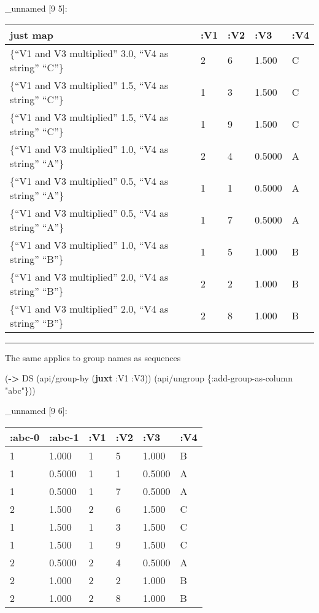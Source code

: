 \documentclass[]{article}
\newenvironment{Shaded}{\begin{snugshade}}{\end{snugshade}}
\newcommand{\KeywordTok}[1]{\textcolor[rgb]{0.13,0.29,0.53}{\textbf{#1}}}
\newcommand{\StringTok}[1]{\textcolor[rgb]{0.31,0.60,0.02}{#1}}
\newcommand{\AttributeTok}[1]{\textcolor[rgb]{0.77,0.63,0.00}{#1}}
\newcommand{\NormalTok}[1]{#1}
\begin{document}
\_unnamed {[}9 5{]}:

\begin{longtable}[]{@{}lllll@{}}
\toprule
just map & :V1 & :V2 & :V3 & :V4\tabularnewline
\midrule
\endhead
\{``V1 and V3 multiplied'' 3.0, ``V4 as string'' ``C''\} & 2 & 6 & 1.500
& C\tabularnewline
\{``V1 and V3 multiplied'' 1.5, ``V4 as string'' ``C''\} & 1 & 3 & 1.500
& C\tabularnewline
\{``V1 and V3 multiplied'' 1.5, ``V4 as string'' ``C''\} & 1 & 9 & 1.500
& C\tabularnewline
\{``V1 and V3 multiplied'' 1.0, ``V4 as string'' ``A''\} & 2 & 4 &
0.5000 & A\tabularnewline
\{``V1 and V3 multiplied'' 0.5, ``V4 as string'' ``A''\} & 1 & 1 &
0.5000 & A\tabularnewline
\{``V1 and V3 multiplied'' 0.5, ``V4 as string'' ``A''\} & 1 & 7 &
0.5000 & A\tabularnewline
\{``V1 and V3 multiplied'' 1.0, ``V4 as string'' ``B''\} & 1 & 5 & 1.000
& B\tabularnewline
\{``V1 and V3 multiplied'' 2.0, ``V4 as string'' ``B''\} & 2 & 2 & 1.000
& B\tabularnewline
\{``V1 and V3 multiplied'' 2.0, ``V4 as string'' ``B''\} & 2 & 8 & 1.000
& B\tabularnewline
\bottomrule
\end{longtable}

\begin{center}\rule{0.5\linewidth}{0.5pt}\end{center}

The same applies to group names as sequences

\begin{Shaded}
\begin{Highlighting}[]
\NormalTok{(}\KeywordTok{->}\NormalTok{ DS}
\NormalTok{    (api/group-by (}\KeywordTok{juxt} \AttributeTok{:V1} \AttributeTok{:V3}\NormalTok{))}
\NormalTok{    (api/ungroup \{}\AttributeTok{:add-group-as-column} \StringTok{"abc"}\NormalTok{\}))}
\end{Highlighting}
\end{Shaded}

\_unnamed {[}9 6{]}:

\begin{longtable}[]{@{}llllll@{}}
\toprule
:abc-0 & :abc-1 & :V1 & :V2 & :V3 & :V4\tabularnewline
\midrule
\endhead
1 & 1.000 & 1 & 5 & 1.000 & B\tabularnewline
1 & 0.5000 & 1 & 1 & 0.5000 & A\tabularnewline
1 & 0.5000 & 1 & 7 & 0.5000 & A\tabularnewline
2 & 1.500 & 2 & 6 & 1.500 & C\tabularnewline
1 & 1.500 & 1 & 3 & 1.500 & C\tabularnewline
1 & 1.500 & 1 & 9 & 1.500 & C\tabularnewline
2 & 0.5000 & 2 & 4 & 0.5000 & A\tabularnewline
2 & 1.000 & 2 & 2 & 1.000 & B\tabularnewline
2 & 1.000 & 2 & 8 & 1.000 & B\tabularnewline
\bottomrule
\end{longtable}
\end{document}
